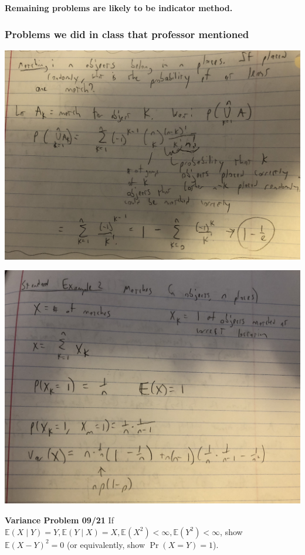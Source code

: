 \documentclass{article}
\newcommand{\E}{\mathbb{E}}
\begin{document}
\textbf{Remaining problems are likely to be indicator method.}



\subsubsection{Problems we did in class that professor mentioned}

\includegraphics[scale=0.1]{prob_classex_matching}

\includegraphics[scale=0.1]{prob_classex_matching2}

\textbf{Variance Problem 09/21}  If \(\E(X \mid Y) = Y, \E(Y \mid X) = X, \E(X^2) < \infty, \E(Y^2) < \infty\), show \(\E(X-Y)^2 = 0 \) (or equivalently, show \(\Pr(X = Y) = 1\)).
\end{document}
